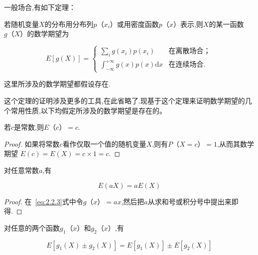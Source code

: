 一般场合,有如下定理：
\begin{theorem}
	若随机变量$ X $的分布用分布列$ p（x_i） $或用密度函数$ p（x） $表示,则$ X $的某一函数$ g（X） $的数学期望为
	
	\begin{equation}
	E[g(X)]=\left\{\begin{array}{ll}
	{\sum_{i} g\left(x_{i}\right) p\left(x_{i}\right)}&{\text{在离散场合；}} \\ {\int_{-\infty}^{+\infty} g(x) p(x) \mathrm{d} x} &{\text{在连续场合.}} 
	\end{array}\right. \label{eq:2.2.3}
	\end{equation}
	
	这里所涉及的数学期望都假设存在.
	
	这个定理的证明涉及更多的工具,在此省略了.现基于这个定理来证明数学期望的几个常用性质,以下均假定所涉及的数学期望是存在的。
	
\end{theorem}

\begin{property}
	
	若$ c $是常数,则$ E（c）=c $.
	
\end{property}

\begin{proof}
	如果将常数$ c $看作仅取一个值的随机变量$ X $,则有$ P（X=c）=1 $,从而其数学期望 $ E(c)=E(X)=c \times 1=c $.
\end{proof}

\begin{property}
	对任意常数$ a $,有
	
	\begin{equation}
	E ( a X ) = a E ( X ) \label{eq:2.2.4}
	\end{equation}
	
\end{property}

\begin{proof}
	在~\ref{eq:2.2.3}式中令$ g（x）=ax $,然后把$ a $从求和号或积分号中提出来即得.
\end{proof}

\begin{property}
	对任意的两个函数$ g_1（x） $和$ g_2（x） $,有
	
	\begin{equation}
	E \left[ g _ { 1 } ( X ) \pm g _ { 2 } ( X ) \right] = E \left[ g _ { 1 } ( X ) \right] \pm E \left[ g _ { 2 } ( X ) \right] \label{eq:2.2.5}
	\end{equation}
	
\end{property}

